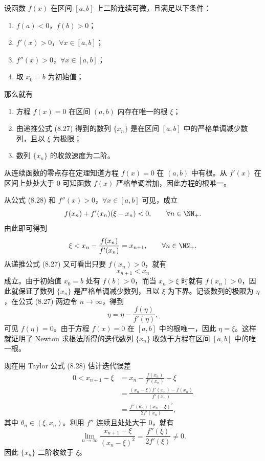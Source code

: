 \begin{xtheorem}[8.7.1]
设函数 $f(x)$ 在区间 $[a,b]$ 上二阶连续可微，且满足以下条件：
\begin{enumerate}[label=(\arabic*)]
  \item $f(a)<0$，$f(b)>0$；
  \item $f'(x)>0$，$\forall x\in[a,b]$；
  \item $f''(x)>0$，$\forall x\in[a,b]$；
  \item 取 $x_0=b$ 为初始值；
\end{enumerate}
那么就有
\begin{enumerate}[label=(\arabic*)]
  \item 方程 $f(x)=0$ 在区间 $(a,b)$ 内存在唯一的根 $\xi$；
  \item 由递推公式 (8.27) 得到的数列 $\{x_n\}$ 是在区间 $[a,b]$ 中的严格单调减少数列，且以 $\xi$ 为极限；
  \item 数列 $\{x_n\}$ 的收敛速度为二阶。
\end{enumerate}
\end{xtheorem}
\begin{xproof}
从连续函数的零点存在定理知道方程 $f(x)=0$ 在 $(a,b)$ 中有根。从 $f'(x)$ 在区间上处处大于 0 可知函数 $f(x)$ 严格单调增加，因此方程的根唯一。

从公式 (8.28) 和 $f''(x)>0$，$\forall x\in[a,b]$ 可见，成立
\[
  f(x_n)+f'(x_n)(\xi-x_n)<0,\qquad\forall n\in\NN_+.
\]
由此即可得到
\[
  \xi<x_n-\frac{f(x_n)}{f'(x_n)}=x_{n+1},\qquad\forall n\in\NN_+.
\]
从递推公式 (8.27) 又可看出只要 $f(x_n)>0$，就有
\[
  x_{n+1}<x_n
\]
成立。由于初始值 $x_0=b$ 处有 $f(b)>0$，而当 $x_n>\xi$ 时就有 $f(x_n)>0$，因此就保证了数列 $\{x_n\}$ 是严格单调减少数列，且以 $\xi$ 为下界。记该数列的极限为 $\eta$，在公式 (8.27) 两边令 $n\to\infty$，得到
\[
  \eta=\eta-\frac{f(\eta)}{f'(\eta)},
\]
可见 $f(\eta)=0$。由于方程 $f(x)=0$ 在 $[a,b]$ 中的根唯一，因此 $\eta=\xi$。这样就证明了 Newton 求根法所得的迭代数列 $\{x_n\}$ 收敛于方程在区间 $[a,b]$ 中的唯一根。

现在用 Taylor 公式 (8.28) 估计迭代误差
\begin{align*}
  0<x_{n+1}-\xi
  &=x_n-\frac{f(x_n)}{f'(x_n)}-\xi\\
  &=\frac{(x_n-\xi)f'(x_n)-f(x_n)}{f'(x_n)}\\
  &=\frac{f''(\theta_n)(x_n-\xi)^2}{2f'(x_n)},
\end{align*}
其中 $\theta_n\in(\xi,x_n)$。利用 $f''$ 连续且处处大于 0，就有
\[
  \lim_{n\to\infty}\frac{x_{n+1}-\xi}{(x_n-\xi)^2}
  =\frac{f''(\xi)}{2f'(\xi)}\ne0.
\]
因此 $\{x_n\}$ 二阶收敛于 $\xi$。
\end{xproof}

